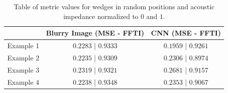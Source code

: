 \documentclass[conference]{IEEEtran}
\begin{document}
\begin{table}[!t]
\renewcommand{\arraystretch}{1.2}
\caption{Table of metric values for wedges in random positions and acoustic impedance normalized to $0$ and $1$.}
\label{table_caso_6}
\centering
\begin{tabular}{|c||c||c|}
\hline
  & Blurry Image (MSE - FFTI) & CNN (MSE - FFTI)\\
\hline
Example 1 & $0.2283$ | $0.9333$ & $0.1959$ | $0.9261$\\
\hline
Example 2 & $0.2235$ | $0.9309$ & $0.2306$ | $0.8974$\\
\hline
Example 3 & $0.2319$ | $0.9321$ & $0.2681$ | $0.9157$\\
\hline
Example 4 & $0.2238$ | $0.9348$ & $0.2353$ | $0.9067$\\
\hline
\end{tabular}
\end{table}
\end{document}
